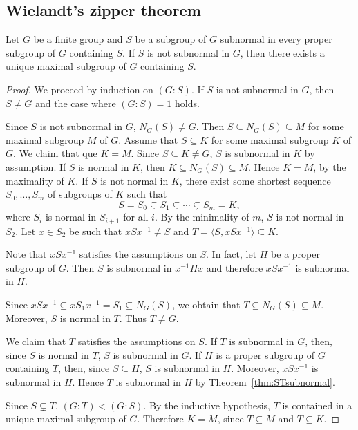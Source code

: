 \subsection{Wielandt's zipper theorem}

\begin{theorem}[Wielandt]
	\label{thm:zipper}
	Let $G$ be a finite group and $S$ be a subgroup of $G$ subnormal in every 
    proper subgroup of $G$ containing $S$. If $S$ is not subnormal in $G$, 
    then there exists a unique maximal subgroup of $G$ containing $S$. 
\end{theorem}

\begin{proof}
	We proceed by induction on $(G:S)$. If $S$ is not subnormal in $G$, then 
	$S\ne G$ and the case where $(G:S)=1$ holds. 

	Since $S$ is not subnormal in $G$, $N_G(S)\ne G$. Then $S\subseteq
	N_G(S)\subseteq M$ for some maximal subgroup $M$ of $G$. Assume that 
	$S\subseteq K$ for some maximal subgroup $K$ of $G$. We claim that 
	que $K=M$. Since $S\subseteq K\ne G$, $S$ is subnormal in $K$ by assumption. If $S$ is 
	normal in $K$, then $K\subseteq N_G(S)\subseteq M$. Hence $K=M$, by the maximality of $K$. 
	If $S$ is not normal in $K$, there exist some shortest sequence 
	$S_0,\dots,S_m$ of subgroups of $K$ such that 
	\[
		S=S_0\subsetneq S_1\subsetneq\cdots\subsetneq S_m=K,
	\]
    where $S_i$ is normal in $S_{i+1}$ for all $i$. By the minimality of $m$,  
	$S$ is not normal in $S_2$. Let $x\in S_2$ be such that $xSx^{-1}\ne S$ and 
	$T=\langle S,xSx^{-1}\rangle\subseteq K$. 

    Note that $xSx^{-1}$ satisfies the assumptions on $S$. In fact, let $H$ be a proper subgroup of $G$. 
    Then $S$ is subnormal in $x^{-1}Hx$ and therefore 
    $xSx^{-1}$ is subnormal in $H$. 
    
	Since $xSx^{-1}\subseteq xS_1x^{-1}=S_1\subseteq N_G(S)$, we obtain that 
	$T\subseteq N_G(S)\subseteq M$. Moreover, $S$ is normal in $T$. Thus $T\ne G$. 

	We claim that $T$ satisfies the assumptions on $S$. If $T$ is subnormal in $G$, then, since 
	$S$ is normal in $T$, $S$ is subnormal in $G$. If $H$ is a proper subgroup of $G$ 
    containing $T$, then, since 
	$S\subseteq H$, $S$ is subnormal in $H$. Moreover, $xSx^{-1}$ is subnormal in $H$. Hence 
	$T$ is subnormal in $H$ by Theorem~\ref{thm:STsubnormal}.

	Since $S\subsetneq T$, $(G:T)<(G:S)$. By the inductive hypothesis, $T$ is contained in a unique maximal subgroup of $G$. Therefore
	$K=M$, since $T\subseteq M$ and 
	$T\subseteq K$.
\end{proof}

